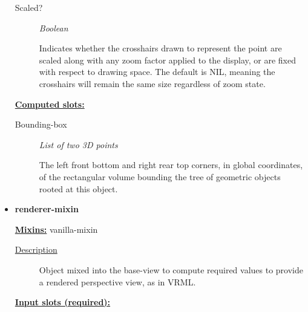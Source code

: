\documentclass [11pt]{book}
\begin{document}
\begin{itemize}
\begin{description}
\item [Scaled?]
\emph{Boolean}

 Indicates whether the crosshairs drawn to represent the point are scaled along with
any zoom factor applied to the display, or are fixed with respect to drawing space. The default is NIL,
meaning the crosshairs will remain the same size regardless of zoom state.




\end{description}






\textbf{
\underline{Computed slots:}}

\begin{description}

\item [Bounding-box]
\emph{List of two 3D points}

 The left front bottom and right rear top corners, in global coordinates,
of the rectangular volume bounding the tree of geometric objects rooted at this object.




\end{description}







\item {}
\label{prim:renderer-mixin}
\textbf{renderer-mixin}


\textbf{
\underline{Mixins:}} vanilla-mixin





\begin{description}

\item [
\underline{Description}]


Object mixed into the base-view to compute required values to provide
a rendered perspective view, as in VRML.



\end{description}








\textbf{
\underline{Input slots (required):}}

\begin{description}


\end{description}
\end{itemize}
\end{document}
